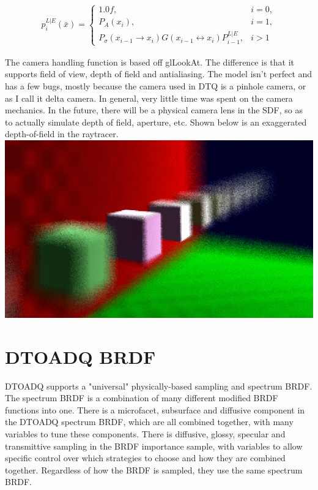 \message{ !name(test.tex)}\documentclass{article}
\begin{document}
  \begin{align}
    p^{L|E}_i(\bar{x}) =
    \begin{cases}
      1.0f, & i = 0,\\
      P_A(x_i), & i = 1,\\
      P_{\sigma}(x_{i-1} \rightarrow x_i) G(x_{i-1} \leftrightarrow x_i)
      P^{L|E}_{i-1}, & i > 1
    \end{cases}
  \end{align}



  The camera handling function is based off glLookAt. The difference is that it
  supports field of view, depth of field and antialiasing. The model isn't
perfect and has a few bugs, mostly because the camera used in DTQ
is a pinhole camera, or as I call it delta camera. In general, very little time
was spent on the camera mechanics. In the future, there will be a physical
camera lens in the SDF, so as to actually simulate depth of field, aperture,
etc. Shown below is an exaggerated depth-of-field in the raytracer.
\\


  \includegraphics[scale=0.5]{rt_dof}

  \section{DTOADQ BRDF}
  DTOADQ supports a "universal" physically-based sampling and spectrum BRDF. The
spectrum BRDF is a combination of many different modified BRDF functions into
one. There is a microfacet, subsurface and diffusive component in the DTOADQ
spectrum BRDF, which are all combined together, with many variables to tune
these components. There is diffusive, glossy, specular and transmittive sampling
in the BRDF importance sample, with variables to allow specific control over
which strategies to choose and how they are combined together. Regardless of how
the BRDF is sampled, they use the same spectrum BRDF.
  
\end{document}
